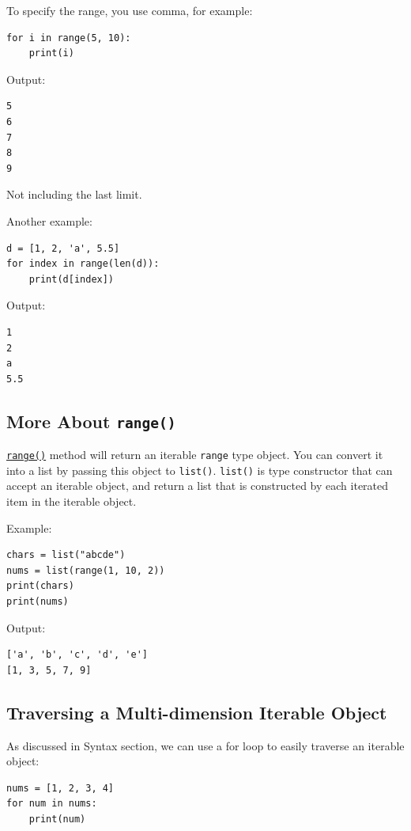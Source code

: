 \documentclass[12pt]{book}
\begin{document}
To specify the range, you use comma, for example:
\begin{verbatim}
for i in range(5, 10):
    print(i)
\end{verbatim}
Output:
\begin{verbatim}
5
6
7
8
9
\end{verbatim}
Not including the last limit.

Another example:
\begin{verbatim}
d = [1, 2, 'a', 5.5]
for index in range(len(d)):
    print(d[index])
\end{verbatim}
Output:
\begin{verbatim}
1
2
a
5.5
\end{verbatim}
\subsection{More About \texttt{range()}}
\label{sec:org3bcd506}
\href{https://docs.python.org/3/library/stdtypes.html\#range}{\texttt{range()}} method will return an iterable \texttt{range} type object. You can convert it into a list by passing this object to \texttt{list()}. \texttt{list()} is type constructor that can accept an iterable object, and return a list that is constructed by each iterated item in the iterable object.

Example:
\begin{verbatim}
chars = list("abcde")
nums = list(range(1, 10, 2))
print(chars)
print(nums)
\end{verbatim}
Output:
\begin{verbatim}
['a', 'b', 'c', 'd', 'e']
[1, 3, 5, 7, 9]
\end{verbatim}
\subsection{Traversing a Multi-dimension Iterable Object}
\label{sec:org045de93}
As discussed in Syntax section, we can use a for loop to easily traverse an iterable object:
\begin{verbatim}
nums = [1, 2, 3, 4]
for num in nums:
    print(num)
\end{verbatim}
\end{document}
